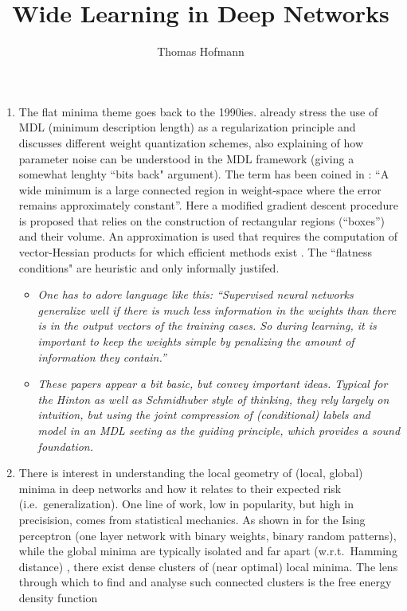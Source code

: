 \documentclass[10pt,a4paper]{article}
\author{Thomas Hofmann}
\title{Wide Learning in Deep Networks}
\begin{document}
\maketitle

\begin{enumerate}
\item 
The flat minima theme goes back to the 1990ies. \cite{hinton1993keeping} already stress the use of MDL  (minimum description length) as a regularization principle and discusses different weight quantization schemes, also explaining of how parameter noise can be understood in the MDL framework (giving a somewhat lenghty ``bits back" argument). The term has been coined in \cite{hochreiter1997flat,hochreiter1995simplifying}: ``A
wide minimum is a large connected region in weight-space where the error remains approximately constant''. Here  a modified gradient descent procedure is proposed that relies on the construction of rectangular regions (``boxes'')  and their volume. An approximation is used that requires the computation of vector-Hessian products for which efficient methods exist \cite{pearlmutter1994fast}. The ``flatness conditions" are heuristic and only informally justifed.
\begin{itemize}
\item \textit{One has to adore language like this: ``Supervised neural networks generalize well if there is much less information in the weights than there is in the output vectors of the training cases. So during learning, it is important to keep the weights simple by penalizing the amount of information they contain.''  \cite[Abstract]{hinton1993keeping}}
\item \textit{These papers appear a bit basic, but convey important ideas. Typical for the Hinton as well as Schmidhuber  style of thinking, they rely largely on intuition, but using the joint compression of (conditional) labels and  model in an MDL seeting as the guiding principle, which provides a sound foundation.}
\end{itemize}
\item 
There is interest in understanding the local geometry of (local, global) minima in deep networks and how it relates to their expected risk (i.e.~generalization). One line of work, low in popularity, but high in precisision, comes from statistical mechanics. As shown in \cite{baldassi2015subdominant} for the Ising perceptron (one layer network with binary weights, binary random patterns), while the global minima are typically isolated and far apart (w.r.t.~Hamming distance) \cite{huang2014origin}, there exist dense clusters of (near optimal) local minima. The lens through which to find and analyse such connected clusters is the free energy density function 

\end{enumerate}
\end{document}
